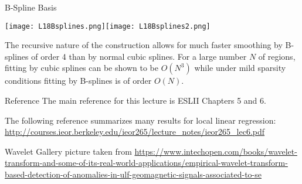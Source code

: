 \documentclass[10pt, table, dvipsnames,xcdraw,handout]{beamer}
\begin{document}
\begin{frame}[fragile]{B-Spline Basis}
  \begin{minipage}[t][0.5\textheight][t]{\textwidth}
	\centering \texttt{[image: L18Bsplines.png]}\texttt{[image: L18Bsplines2.png]} 
  \end{minipage}
  \vfill
\begin{minipage}[t][0.5\textheight][t]{\textwidth}
The recursive nature of the construction allows for much faster smoothing by B-splines of order 4 than by normal cubic splines. For a large number $N$ of regions, fitting by cubic splines can be shown to be $O(N^3)$ while under mild sparsity conditions fitting by B-splines is of order $O(N)$.
\end{minipage}
\end{frame}



\begin{frame}[fragile]{Reference}
The main reference for this lecture is ESLII Chapters 5 and 6. 

The following reference summarizes many results for local linear regression: \url{http://courses.ieor.berkeley.edu/ieor265/lecture_notes/ieor265_lec6.pdf}

Wavelet Gallery picture taken from \url{https://www.intechopen.com/books/wavelet-transform-and-some-of-its-real-world-applications/empirical-wavelet-transform-based-detection-of-anomalies-in-ulf-geomagnetic-signals-associated-to-se}
\end{frame}
\end{document}
